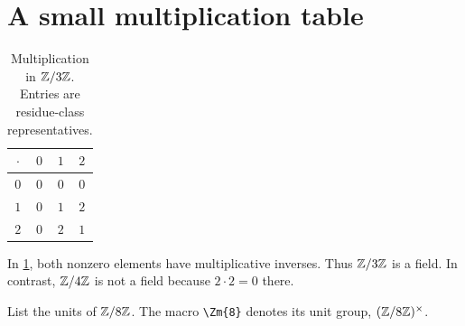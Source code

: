 \documentclass[../../main.tex]{subfiles}
\begin{document}
\section{A small multiplication table}
\begin{table}[htbp]
  \centering
  \caption{Multiplication in $\mathbb Z/3\mathbb Z$. Entries are residue-class representatives.}
  \label{tab:mod-three}
  \begin{tabular}{c@{\qquad}ccc}
    \toprule
    $\cdot$ & $0$ & $1$ & $2$ \\
    \midrule
    $0$ & $0$ & $0$ & $0$ \\
    $1$ & $0$ & $1$ & $2$ \\
    $2$ & $0$ & $2$ & $1$ \\
    \bottomrule
  \end{tabular}
\end{table}
In \cref{tab:mod-three}, both nonzero elements have multiplicative inverses.
Thus $\mathbb Z/3\mathbb Z$ is a field. In contrast, $\mathbb Z/4\mathbb Z$ is not a field because
$2\cdot2=0$ there.

\begin{problem}
List the units of $\mathbb Z/8\mathbb Z$. The macro \verb|\Zm{8}| denotes its unit group,
$(\mathbb Z/8\mathbb Z)^\times$.
\end{problem}
\end{document}
